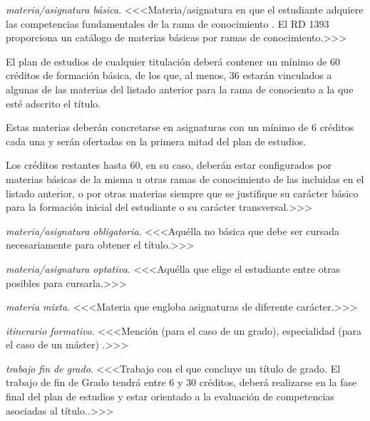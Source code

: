     \item \emph{materia/asignatura básica}. <<<Materia/asignatura en que el estudiante adquiere las
        competencias fundamentales de la rama de conocimiento \cite[artículo
        12, apartado 2]{rd1393}. El RD 1393 \cite[anexo II]{rd1393} proporciona
        un catálogo de materias básicas por ramas de conocimiento.>>>

        El plan de estudios de cualquier titulación deberá contener un mínimo de
        60 créditos de formación básica, de los que, al menos, 36
        estarán vinculados a algunas de las materias del listado anterior
        para la rama de conociento a la que esté adscrito el título\cite[artículo 12,
        apartado 5]{rd1393}.

        Estas materias deberán concretarse en asignaturas con un mínimo
        de 6 créditos cada una y serán ofertadas en la primera
        mitad del plan de estudios.

        Los créditos restantes hasta 60, en su caso, deberán estar configurados por
        materias básicas de la misma u otras ramas de conocimiento de las incluidas en
        el listado anterior, o por otras materias siempre que se justifique su carácter
        básico para la formación inicial del estudiante o su carácter transversal.>>>

    \item \emph{materia/asignatura obligatoria}. <<<Aquélla no básica que debe ser cursada
        necesariamente para obtener el título\cite[sección
        D.5]{guiaMadridMasD}\cite[artículo 12, apartado 2]{rd1393}.>>>

    \item \emph{materia/asignatura optativa}. <<<Aquélla que elige el estudiante entre
        otras posibles para cursarla\cite[sección
        D.5]{guiaMadridMasD}\cite[artículo 12, apartado 2]{rd1393}.>>>

    \item \emph{materia mixta}. <<<Materia que engloba asignaturas de diferente
        carácter\cite[sección D.5]{guiaMadridMasD}\cite[artículo 12, apartado 
        2]{rd1393}.>>>

    \item \emph{itinerario formativo}. <<<Mención (para el caso de un grado),
        especialidad (para el caso de un máster) \cite[sección
        D.4]{guiaMadridMasD}\cite[artículo 9, apartado 3]{rd1393}.>>>

    \item \emph{trabajo fin de grado}. <<<Trabajo con el que concluye un título de
        grado\cite[artículo 12, apartado 3]{rd1393}. El trabajo de fin de Grado
        tendrá entre 6 y 30 créditos, deberá realizarse en la fase final del
        plan de estudios y estar orientado a la evaluación de competencias
        asociadas al título.\cite[artículo 12, apartado 7]{rd1393}.>>>

